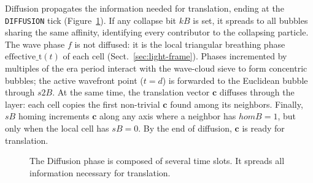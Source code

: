 \documentclass{ijuc}
\begin{document}
Diffusion propagates the information needed for translation, ending at the \texttt{DIFFUSION} tick (Figure~\ref{fig:diffusion}). If any collapse bit $kB$ is set, it spreads to all bubbles sharing the same affinity, identifying every contributor to the collapsing particle.
The wave phase $f$ is not diffused: it is the local triangular breathing phase $\mathrm{effective\_t}(t)$ of each cell (Sect.~\ref{sec:light-frame}). Phases incremented by multiples of the era period interact with the wave-cloud sieve to form concentric bubbles; the active wavefront point ($t=d$) is forwarded to the Euclidean bubble through $s2B$.
At the same time, the translation vector $\mathbf{c}$ diffuses through the layer: each cell copies the first non-trivial $\mathbf{c}$ found among its neighbors. Finally, $sB$ homing increments $\boldsymbol{c}$ along any axis where a neighbor has $homB=1$, but only when the local cell has $sB=0$. By the end of diffusion, $\boldsymbol{c}$ is ready for translation.
\begin{figure}
\begin{center}
\end{center}
\caption{The Diffusion phase is composed of several time slots. It spreads all information necessary for translation.}
\label{fig:diffusion}
\end{figure}
\end{document}
